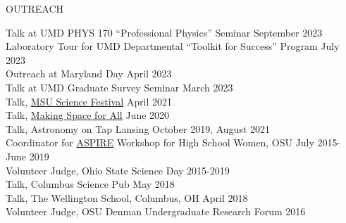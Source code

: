 \documentclass{resume} %
\begin{document}
\begin{rSection}{OUTREACH}

Talk at UMD PHYS 170 ``Professional Physics'' Seminar \hfill September 2023 \\
Laboratory Tour for UMD Departmental ``Toolkit for Success'' Program \hfill July 2023 \\
Outreach at Maryland Day \hfill April 2023 \\
Talk at UMD Graduate Survey Seminar  \hfill March 2023 \\
Talk, \href{https://sciencefestival.msu.edu/schools/virtual-school-programs}{MSU Science Festival} \hfill April 2021 \\
Talk, \href{https://astronomy.osu.edu/events/making-space-all-chasing-ghost-particle}{Making Space for All} \hfill June 2020 \\
Talk, Astronomy on Tap Lansing \hfill October 2019, August 2021 \\
Coordinator for \href{u.osu.edu/aspire}{ASPIRE} Workshop for High School Women, OSU \hfill July 2015-June 2019\\
Volunteer Judge, Ohio State Science Day \hfill 2015-2019\\
Talk, Columbus Science Pub \hfill  May 2018\\
Talk, The Wellington School, Columbus, OH \hfill April 2018\\
Volunteer Judge, OSU Denman Undergraduate Research Forum \hfill 2016\\
\end{rSection}
\vspace{-0.30cm}
\end{document}
